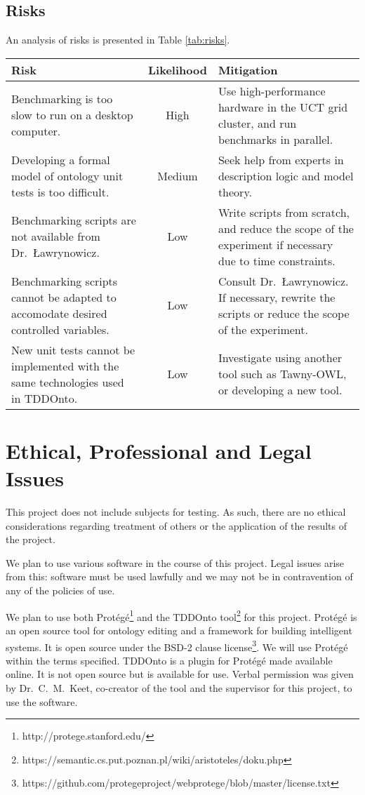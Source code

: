 \documentclass[draft]{sig-alternate}
\begin{document}
\subsection{Risks}

An analysis of risks is presented in Table \ref{tab:risks}.

\begin{table*}
  \caption{Analysis of risks}
  \label{tab:risks}
  \vspace{6pt}
  \setlength{\extrarowheight}{4pt}
  \begin{tabularx}{\textwidth}{XcX}
    Risk & Likelihood & Mitigation \\ \hline
    Benchmarking is too slow to run on a desktop computer. &
    High &
    Use high-performance hardware in the UCT grid cluster, and run benchmarks in parallel. \\
    Developing a formal model of ontology unit tests is too difficult. &
    Medium &
    Seek help from experts in description logic and model theory. \\
    Benchmarking scripts are not available from Dr.\ {\L}awrynowicz. &
    Low &
    Write scripts from scratch, and reduce the scope of the experiment if necessary due to time constraints. \\
    Benchmarking scripts cannot be adapted to accomodate desired controlled variables. &
    Low &
    Consult Dr.\ {\L}awrynowicz.  If necessary, rewrite the scripts or reduce the scope of the experiment. \\
    New unit tests cannot be implemented with the same technologies used in TDDOnto. &
    Low &
    Investigate using another tool such as Tawny-OWL, or developing a new tool.
  \end{tabularx}
\end{table*}

\section{Ethical, Professional and Legal Issues}

This project does not include subjects for testing. As such, there are no ethical considerations regarding treatment of others or the application of the results of the project.

We plan to use various software in the course of this project. Legal issues arise from this: software must be used lawfully and we may not be in contravention of any of the policies of use.

We plan to use both Prot\'eg\'e\footnote{http://protege.stanford.edu/} and the TDDOnto tool\footnote{https://semantic.cs.put.poznan.pl/wiki/aristoteles/doku.php} for this project. Prot\'eg\'e is an open source tool for ontology editing and a framework for building intelligent systems. It is open source under the BSD-2 clause license\footnote{https://github.com/protegeproject/webprotege/blob/master/license.txt}. We will use Prot\'eg\'e within the terms specified. TDDOnto is a plugin for Prot\'eg\'e made available online. It is not open source but is available for use. Verbal permission was given by Dr.\ C.\ M.\ Keet, co-creator of the tool and the supervisor for this project, to use the software.
\end{document}
